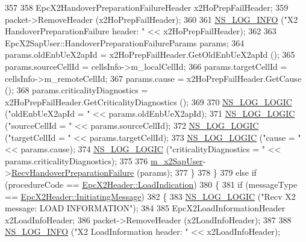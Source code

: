 \begin{DoxyCode}
357 
358           EpcX2HandoverPreparationFailureHeader x2HoPrepFailHeader;
359           packet->RemoveHeader (x2HoPrepFailHeader);
360 
361           \hyperlink{group__logging_gafbd73ee2cf9f26b319f49086d8e860fb}{NS\_LOG\_INFO} (\textcolor{stringliteral}{"X2 HandoverPreparationFailure header: "} << x2HoPrepFailHeader);
362 
363           EpcX2SapUser::HandoverPreparationFailureParams params;          
364           params.oldEnbUeX2apId = x2HoPrepFailHeader.GetOldEnbUeX2apId ();
365           params.sourceCellId   = cellsInfo->m\_localCellId;
366           params.targetCellId   = cellsInfo->m\_remoteCellId;
367           params.cause          = x2HoPrepFailHeader.GetCause ();
368           params.criticalityDiagnostics = x2HoPrepFailHeader.GetCriticalityDiagnostics ();
369 
370           \hyperlink{group__logging_ga88acd260151caf2db9c0fc84997f45ce}{NS\_LOG\_LOGIC} (\textcolor{stringliteral}{"oldEnbUeX2apId = "} << params.oldEnbUeX2apId);
371           \hyperlink{group__logging_ga88acd260151caf2db9c0fc84997f45ce}{NS\_LOG\_LOGIC} (\textcolor{stringliteral}{"sourceCellId = "} << params.sourceCellId);
372           \hyperlink{group__logging_ga88acd260151caf2db9c0fc84997f45ce}{NS\_LOG\_LOGIC} (\textcolor{stringliteral}{"targetCellId = "} << params.targetCellId);
373           \hyperlink{group__logging_ga88acd260151caf2db9c0fc84997f45ce}{NS\_LOG\_LOGIC} (\textcolor{stringliteral}{"cause = "} << params.cause);
374           \hyperlink{group__logging_ga88acd260151caf2db9c0fc84997f45ce}{NS\_LOG\_LOGIC} (\textcolor{stringliteral}{"criticalityDiagnostics = "} << params.criticalityDiagnostics);
375 
376           \hyperlink{classns3_1_1EpcX2_a0a74a3c19067fe18af3021c7b4c24c19}{m\_x2SapUser}->\hyperlink{classns3_1_1EpcX2SapUser_a805d5df676c49aedd76711dbdb980e17}{RecvHandoverPreparationFailure} (params);
377         \}
378     \}
379   \textcolor{keywordflow}{else} \textcolor{keywordflow}{if} (procedureCode == \hyperlink{classns3_1_1EpcX2Header_afd178c1ed3c47948c587955698a15b0dae86cf17c79745d2849a8c1efcec6a64d}{EpcX2Header::LoadIndication})
380     \{
381       \textcolor{keywordflow}{if} (messageType == \hyperlink{classns3_1_1EpcX2Header_a0e69b043a20eaee4c570f223f4eca715a5761e50c3c1918a44e3a5ebc86f17435}{EpcX2Header::InitiatingMessage})
382         \{
383           \hyperlink{group__logging_ga88acd260151caf2db9c0fc84997f45ce}{NS\_LOG\_LOGIC} (\textcolor{stringliteral}{"Recv X2 message: LOAD INFORMATION"});
384 
385           EpcX2LoadInformationHeader x2LoadInfoHeader;
386           packet->RemoveHeader (x2LoadInfoHeader);
387 
388           \hyperlink{group__logging_gafbd73ee2cf9f26b319f49086d8e860fb}{NS\_LOG\_INFO} (\textcolor{stringliteral}{"X2 LoadInformation header: "} << x2LoadInfoHeader);

\end{DoxyCode}

